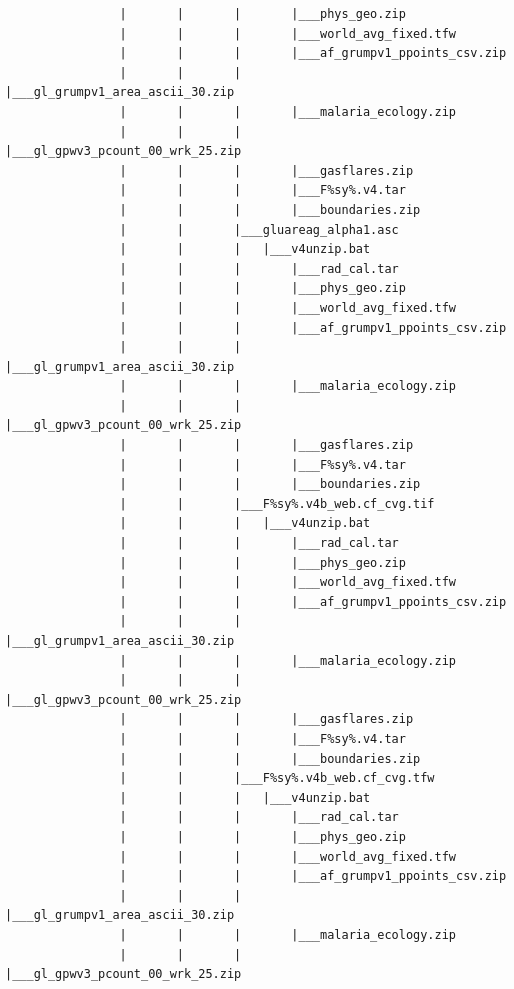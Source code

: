 \documentclass[]{book}
\begin{document}
\begin{verbatim}
                |       |       |       |___phys_geo.zip
                |       |       |       |___world_avg_fixed.tfw
                |       |       |       |___af_grumpv1_ppoints_csv.zip
                |       |       |       |___gl_grumpv1_area_ascii_30.zip
                |       |       |       |___malaria_ecology.zip
                |       |       |       |___gl_gpwv3_pcount_00_wrk_25.zip
                |       |       |       |___gasflares.zip
                |       |       |       |___F%sy%.v4.tar
                |       |       |       |___boundaries.zip
                |       |       |___gluareag_alpha1.asc
                |       |       |   |___v4unzip.bat
                |       |       |       |___rad_cal.tar
                |       |       |       |___phys_geo.zip
                |       |       |       |___world_avg_fixed.tfw
                |       |       |       |___af_grumpv1_ppoints_csv.zip
                |       |       |       |___gl_grumpv1_area_ascii_30.zip
                |       |       |       |___malaria_ecology.zip
                |       |       |       |___gl_gpwv3_pcount_00_wrk_25.zip
                |       |       |       |___gasflares.zip
                |       |       |       |___F%sy%.v4.tar
                |       |       |       |___boundaries.zip
                |       |       |___F%sy%.v4b_web.cf_cvg.tif
                |       |       |   |___v4unzip.bat
                |       |       |       |___rad_cal.tar
                |       |       |       |___phys_geo.zip
                |       |       |       |___world_avg_fixed.tfw
                |       |       |       |___af_grumpv1_ppoints_csv.zip
                |       |       |       |___gl_grumpv1_area_ascii_30.zip
                |       |       |       |___malaria_ecology.zip
                |       |       |       |___gl_gpwv3_pcount_00_wrk_25.zip
                |       |       |       |___gasflares.zip
                |       |       |       |___F%sy%.v4.tar
                |       |       |       |___boundaries.zip
                |       |       |___F%sy%.v4b_web.cf_cvg.tfw
                |       |       |   |___v4unzip.bat
                |       |       |       |___rad_cal.tar
                |       |       |       |___phys_geo.zip
                |       |       |       |___world_avg_fixed.tfw
                |       |       |       |___af_grumpv1_ppoints_csv.zip
                |       |       |       |___gl_grumpv1_area_ascii_30.zip
                |       |       |       |___malaria_ecology.zip
                |       |       |       |___gl_gpwv3_pcount_00_wrk_25.zip

\end{verbatim}
\end{document}
